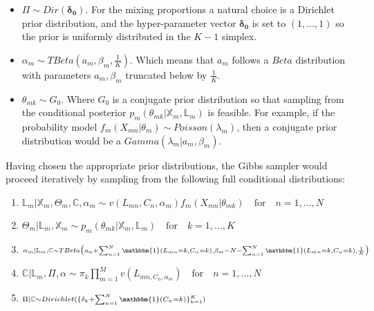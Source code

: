 \begin{itemize}
	\item $\Pi \sim Dir(\mathbf{\delta_{0}})$. For the mixing proportions a natural choice is a Dirichlet prior distribution, and the hyper-parameter vector $\mathbf{\delta_{0}}$ is set to $(1,...,1)$ so the prior is uniformly distributed in the $K-1$ simplex.
	\item $\alpha_{m} \sim TBeta(\mathit{a_{m}}, \beta_{m}, \frac{1}{K})$. Which means that $a_{m}$ follows a  $Beta$ distribution with parameters $\mathit{a_{m}}, \beta_{m}$ truncated below by $\frac{1}{K}$.
	\item $\theta_{mk} \sim G_{0}$. Where $G_{0}$ is a conjugate prior distribution so that sampling from the conditional posterior $p_{m}(\theta_{mk}|\mathbb{X}_{m}, \mathbb{L}_{m})$ is feasible. For example, if the probability model $f_{m}(X_{mn}|\theta_{m}) \sim Poisson(\lambda_{m})$, then a conjugate prior distribution would be a $Gamma(\lambda_{m}|\mathit{a_{m}}, \beta_{m})$.
\end{itemize}

Having chosen the appropriate prior distributions, the Gibbs sampler would proceed iteratively by sampling from the following full conditional distributions:

\begin{enumerate}
	\item $\scriptstyle \mathbb{L}_{m} | \mathbb{X}_{m}, \Theta_{m}, \mathbb{C}, \alpha_{m} \sim v(L_{mn}, C_{n}, \alpha_{m}) f_{m}(X_{mn}|\theta_{mk}) \quad \text{for} \quad n=1,...,N $
	\item $\scriptstyle \Theta_{m}|\mathbb{L}_{m}, \mathbb{X}_{m} \sim p_{m}(\theta_{mk}|\mathbb{X}_{m}, \mathbb{L}_{m}) \quad \text{for} \quad k=1,...,K $
	\item $\scriptstyle \alpha_{m}|\mathbb{L}_{m}, \mathbb{C} \sim TBeta \big(\mathit{a_{m}}+\sum_{n=1}^{N}\mathbbm{1}(L_{mn}=k,C_{n}=k), \beta_{m}-N-\sum_{n=1}^{N}\mathbbm{1}(L_{mn}=k,C_{n}=k), \frac{1}{K}\big)$
	\item $\scriptstyle \mathbb{C}|\mathbb{L}_{m}, \Pi, \alpha \sim \pi_{k}\prod_{m=1}^{M}v(L_{mn, C_{n}, \alpha_{m}}) \quad \text{for} \quad n=1,...,N$
	\item $\scriptstyle \Pi|\mathbb{C} \sim Dirichlet(\{ \delta_{k} + \sum_{n=1}^{N}\mathbbm{1}(C_{n}=k)\}_{k=1}^{K })$
\end{enumerate}